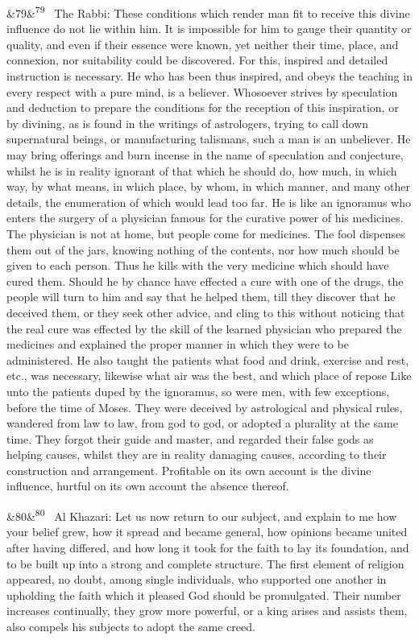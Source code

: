 \documentclass[12pt]{article}
\newcommand{\para}[1][]{\par\noindent\ifx&#1&\else\textsuperscript{\footnotesize #1}~\fi}
\begin{document}
\para[79] The Rabbi: These conditions which render man fit to receive this divine influence do not lie within him. It is impossible for him to gauge their quantity or quality, and even if their essence were known, yet neither their time, place, and connexion, nor suitability could be discovered. For this, inspired and detailed instruction is necessary. He who has been thus inspired, and obeys the teaching in every respect with a pure mind, is a believer. Whosoever strives by speculation and deduction to prepare the conditions for the reception of this inspiration, or by divining, as is found in the writings of astrologers, trying to call down supernatural beings, or manufacturing talismans, such a man is an unbeliever. He may bring offerings and burn incense in the name of speculation and conjecture, whilst he is in reality ignorant of that which he should do, how much, in which way, by what means, in which place, by whom, in which manner, and many other details, the enumeration of which would lead too far. He is like an ignoramus who enters the surgery of a physician famous for the curative power of his medicines. The physician is not at home, but people come for medicines. The fool dispenses them out of the jars, knowing nothing of the contents, nor how much should be given to each person. Thus he kills with the very medicine which should have cured them. Should he by chance have effected a cure with one of the drugs, the people will turn to him and say that he helped them, till they discover that he deceived them, or they seek other advice, and cling to this without noticing that the real cure was effected by the skill of the learned physician who prepared the medicines and explained the proper manner in which they were to be administered. He also taught the patients what food and drink, exercise and rest, etc., was necessary, likewise what air was the best, and which place of repose Like unto the patients duped by the ignoramus, so were men, with few exceptions, before the time of Moses. They were deceived by astrological and physical rules, wandered from law to law, from god to god, or adopted a plurality at the same time. They forgot their guide and master, and regarded their false gods as helping causes, whilst they are in reality damaging causes, according to their construction and arrangement. Profitable on its own account is the divine influence, hurtful on its own account the absence thereof.

\para[80] Al Khazari: Let us now return to our subject, and explain to me how your belief grew, how it spread and became general, how opinions became united after having differed, and how long it took for the faith to lay its foundation, and to be built up into a strong and complete structure. The first element of religion appeared, no doubt, among single individuals, who supported one another in upholding the faith which it pleased God should be promulgated. Their number increases continually, they grow more powerful, or a king arises and assists them, also compels his subjects to adopt the same creed.
\end{document}
